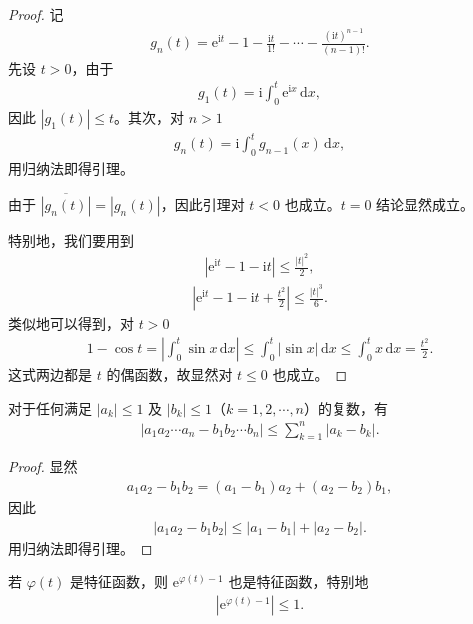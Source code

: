 \documentclass[../../main.tex]{subfiles}
\begin{document}
\begin{proof}
记
\begin{align*}
g_n(t)=\mathrm{e}^{\mathrm{i}t}-1-\frac{\mathrm{i}t}{1!}-\cdots-\frac{(\mathrm{i}t)^{n-1}}{(n-1)!}.
\end{align*}
先设 $t>0$，由于
\begin{align}
g_1(t)=\mathrm{i}\int_{0}^{t}\mathrm{e}^{\mathrm{i}x}\,\mathrm{d}x,
\end{align}
因此 $|g_1(t)|\leqslant t$。其次，对 $n>1$
\begin{align}
g_n(t)=\mathrm{i}\int_{0}^{t}g_{n-1}(x)\,\mathrm{d}x,
\end{align}
用归纳法即得引理。

由于 $\overline{|g_n(t)|}=|g_n(t)|$，因此引理对 $t<0$ 也成立。$t=0$ 结论显然成立。

特别地，我们要用到
\begin{align}
|\mathrm{e}^{\mathrm{i}t}-1-\mathrm{i}t|\leqslant\frac{|t|^{2}}{2},
\end{align}
\begin{align}
\left|\mathrm{e}^{\mathrm{i}t}-1-\mathrm{i}t+\frac{t^{2}}2\right|\leqslant\frac{|t|^{3}}6.
\end{align}
类似地可以得到，对 $t>0$
\begin{align}
1-\cos t=\left|\int_{0}^{t}\sin x\,\mathrm{d}x\right|\leqslant\int_{0}^{t}|\sin x|\,\mathrm{d}x\leqslant\int_{0}^{t}x\,\mathrm{d}x=\frac{t^{2}}2.
\end{align}
这式两边都是 $t$ 的偶函数，故显然对 $t\leqslant0$ 也成立。
\end{proof}

\begin{lemma}\label{lemma:ch05-乘积估计}
对于任何满足 $|a_k|\leqslant1$ 及 $|b_k|\leqslant1$（$k=1,2,\cdots,n$）的复数，有
\begin{align}
|a_1a_2\cdots a_n-b_1b_2\cdots b_n|\leqslant\sum_{k=1}^{n}|a_k-b_k|.
\end{align}
\end{lemma}

\begin{proof}
显然
\begin{align*}
a_1a_2-b_1b_2=(a_1-b_1)a_2+(a_2-b_2)b_1,
\end{align*}
因此
\begin{align*}
|a_1a_2-b_1b_2|\leqslant|a_1-b_1|+|a_2-b_2|.
\end{align*}
用归纳法即得引理。
\end{proof}

\begin{lemma}\label{lemma:ch05-Poisson化特征函数}
若 $\varphi(t)$ 是特征函数，则 $\mathrm{e}^{\varphi(t)-1}$ 也是特征函数，特别地
\begin{align}
|\mathrm{e}^{\varphi(t)-1}|\leqslant1.
\end{align}
\end{lemma}
\end{document}
